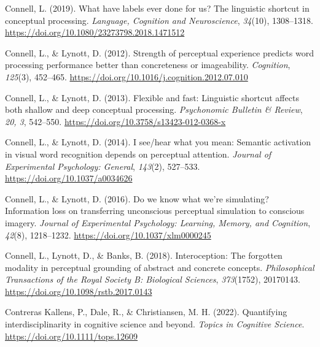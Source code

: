 \documentclass[
  12pt,
  man,floatsintext]{apa7}
\newlength{\cslhangindent}
\newlength{\cslentryspacingunit} %
\newenvironment{CSLReferences}[2] %
 {%
  \setlength{\parindent}{0pt}
  \ifodd #1
  \let\oldpar\par
  \def\par{\hangindent=\cslhangindent\oldpar}
  \fi
  \setlength{\parskip}{#2\cslentryspacingunit}
 }%
 {}
\begin{document}
\begin{CSLReferences}{1}{0}
\leavevmode{}%
Connell, L. (2019). What have labels ever done for us? {The} linguistic shortcut in conceptual processing. \emph{Language, Cognition and Neuroscience}, \emph{34}(10), 1308--1318. \url{https://doi.org/10.1080/23273798.2018.1471512}

\leavevmode{}%
Connell, L., \& Lynott, D. (2012). Strength of perceptual experience predicts word processing performance better than concreteness or imageability. \emph{Cognition}, \emph{125}(3), 452--465. \url{https://doi.org/10.1016/j.cognition.2012.07.010}

\leavevmode{}%
Connell, L., \& Lynott, D. (2013). Flexible and fast: {Linguistic} shortcut affects both shallow and deep conceptual processing. \emph{Psychonomic Bulletin \& Review}, \emph{20, 3}, 542--550. \url{https://doi.org/10.3758/s13423-012-0368-x}

\leavevmode{}%
Connell, L., \& Lynott, D. (2014). I see/hear what you mean: {Semantic} activation in visual word recognition depends on perceptual attention. \emph{Journal of Experimental Psychology: General}, \emph{143}(2), 527--533. \url{https://doi.org/10.1037/a0034626}

\leavevmode{}%
Connell, L., \& Lynott, D. (2016). Do we know what we're simulating? {Information} loss on transferring unconscious perceptual simulation to conscious imagery. \emph{Journal of Experimental Psychology: Learning, Memory, and Cognition}, \emph{42}(8), 1218--1232. \url{https://doi.org/10.1037/xlm0000245}

\leavevmode{}%
Connell, L., Lynott, D., \& Banks, B. (2018). Interoception: The forgotten modality in perceptual grounding of abstract and concrete concepts. \emph{Philosophical Transactions of the Royal Society B: Biological Sciences}, \emph{373}(1752), 20170143. \url{https://doi.org/10.1098/rstb.2017.0143}

\leavevmode{}%
Contreras Kallens, P., Dale, R., \& Christiansen, M. H. (2022). Quantifying interdisciplinarity in cognitive science and beyond. \emph{Topics in Cognitive Science}. \url{https://doi.org/10.1111/tops.12609}


\end{CSLReferences}
\end{document}
